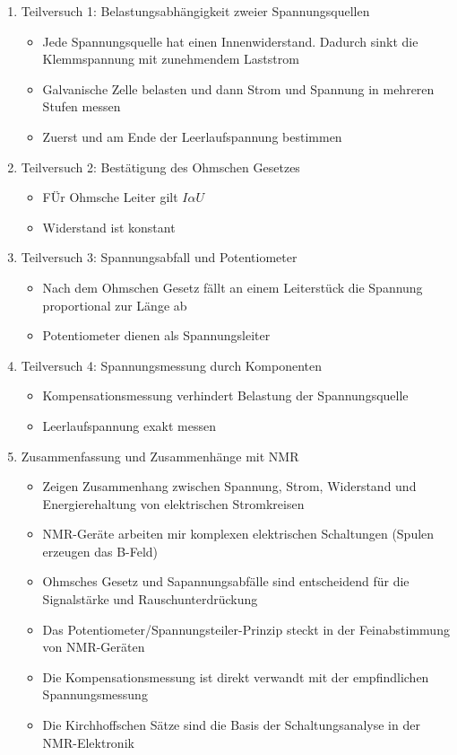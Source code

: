 \documentclass{article}
\begin{document}
    \begin{enumerate}
        \item Teilversuch 1: Belastungsabhängigkeit zweier Spannungsquellen
            \begin{itemize}
                \item Jede Spannungsquelle hat einen Innenwiderstand. Dadurch sinkt die Klemmspannung mit zunehmendem Laststrom
                \item Galvanische Zelle belasten und dann Strom und Spannung in mehreren Stufen messen
                \item Zuerst und am Ende der Leerlaufspannung bestimmen
            \end{itemize}
        \item Teilversuch 2: Bestätigung des Ohmschen Gesetzes
            \begin{itemize}
                 \item FÜr Ohmsche Leiter gilt $I \alpha U$
                \item Widerstand ist konstant
            \end{itemize}
        \item Teilversuch 3: Spannungsabfall und Potentiometer
            \begin{itemize}
                \item Nach dem Ohmschen Gesetz fällt an einem Leiterstück die Spannung proportional zur Länge ab
                \item Potentiometer dienen als Spannungsleiter
            \end{itemize}
        \item Teilversuch 4: Spannungsmessung durch Komponenten
            \begin{itemize}
                \item Kompensationsmessung verhindert Belastung der Spannungsquelle
                \item Leerlaufspannung exakt messen
            \end{itemize}
        \item Zusammenfassung und Zusammenhänge mit NMR
            \begin{itemize}
                \item Zeigen Zusammenhang zwischen Spannung, Strom, Widerstand und Energierehaltung von elektrischen Stromkreisen
                \item NMR-Geräte arbeiten mir komplexen elektrischen Schaltungen (Spulen erzeugen das B-Feld)
                \item Ohmsches Gesetz und Sapannungsabfälle sind entscheidend für die Signalstärke und Rauschunterdrückung
                \item Das Potentiometer/Spannungsteiler-Prinzip steckt in der Feinabstimmung von NMR-Geräten
                \item Die Kompensationsmessung ist direkt verwandt mit der empfindlichen Spannungsmessung
                \item Die Kirchhoffschen Sätze sind die Basis der Schaltungsanalyse in der NMR-Elektronik
            \end{itemize}
    \end{enumerate}
\end{document}
